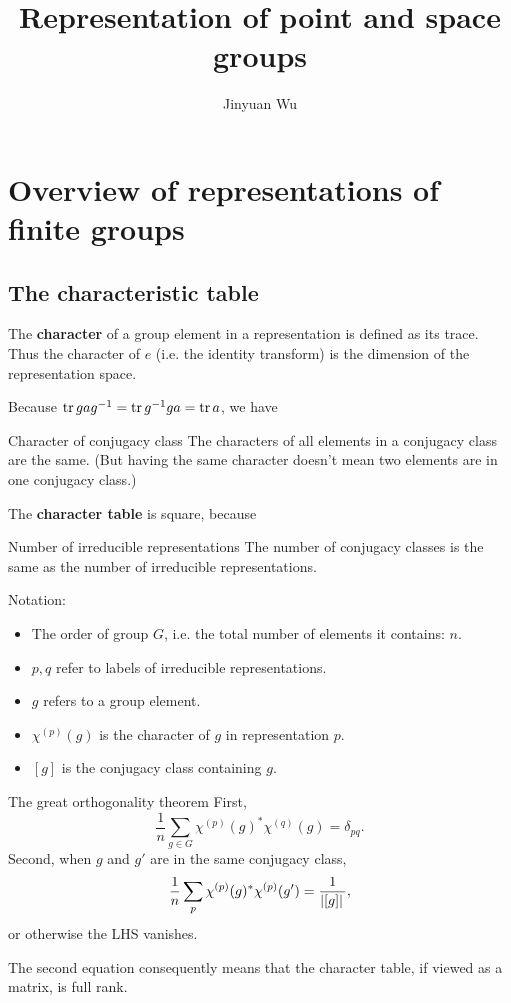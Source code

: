 \documentclass[hyperref, a4paper, 12pt]{article}
\title{Representation of point and space groups}
\author{Jinyuan Wu}
\newcommand*{\concept}[1]{{\textbf{#1}}}
\begin{document}
\maketitle

\section{Overview of representations of finite groups}

\subsection{The characteristic table}

The \concept{character} of a group element in a representation
is defined as its trace.
Thus the character of $e$ (i.e. the identity transform) is 
the dimension of the representation space.

Because $\trace{g a g^{-1}} = \trace{g^{-1} g a} = \trace{a}$, we have

\begin{quotebox*}{Character of conjugacy class}{}
    The characters of all elements in a conjugacy class are the same.
    (But having the same character doesn't mean two elements are in one conjugacy class.)
\end{quotebox*}

The \concept{character table} is square, because

\begin{quotebox*}{Number of irreducible representations}{}
    The number of conjugacy classes is the same as the number of irreducible representations.
\end{quotebox*}

Notation:
\begin{itemize}
    \item The order of group $G$, i.e. the total number of elements it contains: $n$.
    \item $p, q$ refer to labels of irreducible representations.
    \item $g$ refers to a group element.
    \item $\chi^{(p)}(g)$ is the character of $g$ in representation $p$.
    \item $[g]$ is the conjugacy class containing $g$.
\end{itemize}

\begin{quotebox*}{The great orthogonality theorem}{}
    First,
    \[
        \frac{1}{n} \sum_{g \in G} \chi^{(p)}(g)^* \chi^{(q)}(g) = \delta_{pq}.
    \]
    Second, when $g$ and $g'$ are in the same conjugacy class,
    \[
        \frac{1}{n} \sum_p \chi^{(p)}(g)^* \chi^{(p)}(g') = \frac{1}{\abs*{[g]}},
    \]
    or otherwise the LHS vanishes.

    The second equation consequently means that the character table,
    if viewed as a matrix, is full rank.
\end{quotebox*}
\end{document}
